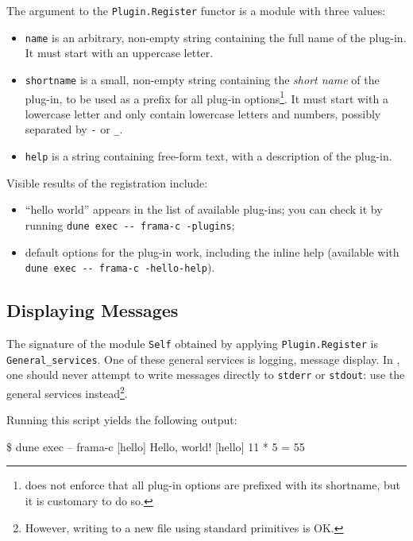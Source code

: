 The argument to the \texttt{Plugin.Register} functor is a module with three
values:
\begin{itemize}
\item \texttt{name} is an arbitrary, non-empty string containing the full name
  of the plug-in. It must start with an uppercase letter.
\item \texttt{shortname} is a small, non-empty string containing the {\em short
  name} of the plug-in, to be used as a prefix for all plug-in
  options\footnote{\framac does not enforce that all plug-in options are
  prefixed with its shortname, but it is customary to do so.}. It must start
  with a lowercase letter and only contain lowercase letters and numbers,
  possibly separated by \texttt{-} or \texttt{\_}.
\item \texttt{help} is a string containing free-form text, with a
  description of the plug-in.
\end{itemize}

Visible results of the registration include:
\begin{itemize}
\item ``hello world'' appears in the list of available plug-ins;
  you can check it by running
  \verb|dune exec -- frama-c -plugins|;
\item default options for the plug-in work, including the inline help
  (available with \verb|dune exec -- frama-c -hello-help|).
\end{itemize}

\subsection{Displaying Messages}\label{tut2:messages}

The signature of the module \texttt{Self} obtained by applying
\texttt{Plugin.Register} is \texttt{General\_services}. One of these general
services is logging, \ie message display. In \framac, one should never attempt
to write messages directly to \texttt{stderr} or \texttt{stdout}: use the
general services instead\footnote{However, writing to a new file using standard
  \ocaml primitives is OK.}.


Running this script yields the following output:
\begin{frama-c-commands}
\$ dune exec -- frama-c
[hello] Hello, world!
[hello] 11 * 5 = 55
\end{frama-c-commands}

